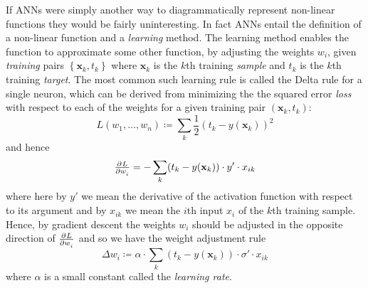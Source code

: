 If ANNs were simply another way to diagrammatically represent non-linear functions they would be fairly uninteresting.
%
In fact ANNs entail the definition of a non-linear function and a \textit{learning} method.
%
The learning method enables the function to approximate some other function, by adjusting the weights \(w_i\), given \textit{training} pairs \(\left\{ \mathbf{x}_k, t_k \right\}\) where \(\mathbf{x}_k\) is the \(k\)th training \textit{sample} and \(t_k\) is the \(k\)th training \textit{target}.
%
The most common such learning rule is called the Delta rule\cite{widrow1960adaptive} for a single neuron, which can be derived from minimizing the the squared error \textit{loss} with respect to each of the weights for a given training pair \((\mathbf{x}_k, t_k)\):
\begin{equation}
    L(w_1, \dots, w_n) \coloneqq \sum_k \frac{1}{2} (t_k - y(\mathbf{x}_k))^2
    \label{eqn:loss}
\end{equation}
and hence
\begin{equation}
    \pd{L}{w_i} = - \sum_k(t_k-y(\mathbf{x}_k))\cdot y'\cdot x_{ik}
\end{equation}
where here by \(y'\) we mean the derivative of the activation function with respect to its argument and by \(x_{ik}\) we mean the \(i\)th input \(x_i\) of the \(k\)th training sample.
%
Hence, by gradient descent the weights \(w_i\) should be adjusted in the opposite direction of \(\pd{L}{w_i}\) and so we have the weight adjustment rule
\begin{equation}
    \Delta w_i \coloneqq \alpha \cdot \sum_k(t_k-y(\mathbf{x}_k))\cdot \sigma'\cdot x_{ik}
    \label{eqn:batchupdate}
\end{equation}
where \(\alpha\) is a small constant called the \textit{learning rate}.

